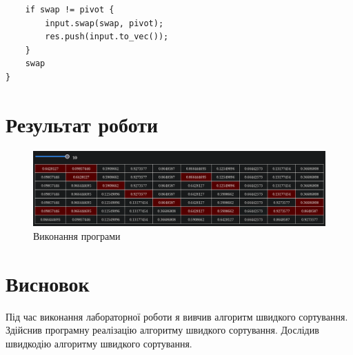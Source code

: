 \documentclass{article}
\begin{document}
\begin{normalsize}
\begin{lstlisting}
	if swap != pivot {
		input.swap(swap, pivot);
		res.push(input.to_vec());
	}
	swap
}
\end{lstlisting}
		
		\section*{Результат роботи}
		\begin{figure}[H]
			\centering
			\includegraphics[scale=0.36]{1}
			\caption{Виконання програми}
		\end{figure}
		
		\section*{Висновок}
		Під час виконання лабораторної роботи я вивчив алгоритм швидкого сортування. Здійснив програмну реалізацію алгоритму швидкого сортування. Дослідив швидкодію алгоритму швидкого сортування.
		
	\end{normalsize}
\end{document}
